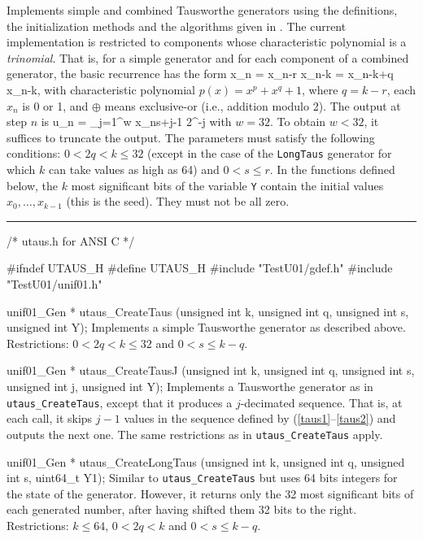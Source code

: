 
Implements simple and combined Tausworthe generators using
the definitions, the initialization methods and the
 algorithms given in \cite{rLEC94a,rLEC96a}.
The current implementation is restricted to components whose
characteristic polynomial is a {\em trinomial}.  That is,
for a  simple generator and for each component of a combined
generator, the basic recurrence has the form %
\eq                                               {}
  x_n = x_{n-r} \oplus x_{n-k} = x_{n-k+q} \oplus x_{n-k},
\endeq
with characteristic polynomial $p(x) = x^p + x^q + 1$,
where $q = k-r$, each $x_n$ is 0 or 1, and $\oplus$
means exclusive-or (i.e., addition modulo 2).
The output at step $n$ is
\eq                                               {}
  u_n = \sum_{j=1}^w x_{ns+j-1} 2^{-j}
\endeq
with $w = 32$.
To obtain $w < 32$, it suffices to truncate the output.
The parameters must satisfy the following conditions:
$0 < 2q < k \le 32$ (except in the case of the {\tt LongTaus} generator
for which $k$ can take values as high as 64) and $0 < s \le r$.
In the functions defined below, the $k$ most significant
bits of the variable {\tt Y} contain
the initial values  $x_0,\dots,x_{k-1}$ (this is the seed).
They must not be all zero.

\bigskip
\hrule
\code
\hide
/* utaus.h for ANSI C */

#ifndef UTAUS_H
#define UTAUS_H
\endhide
#include "TestU01/gdef.h"
#include "TestU01/unif01.h"


unif01_Gen * utaus_CreateTaus (unsigned int k, unsigned int q,
                               unsigned int s, unsigned int Y);
\endcode
  \tab  Implements a simple Tausworthe generator as described above.
   Restrictions: $0 < 2q < k \le 32$ and $0 < s \le k-q$.
  \endtab
\code


unif01_Gen * utaus_CreateTausJ (unsigned int k, unsigned int q,
                                unsigned int s, unsigned int j,
                                unsigned int Y);
\endcode
  \tab  Implements a Tausworthe generator as in {\tt utaus\_CreateTaus},
   except that it produces a $j$-decimated sequence.
   That is, at each call, it skips $j-1$ values in the sequence
   defined by (\ref{taus1}--\ref{taus2}) and outputs the next one.
   The same restrictions as in {\tt utaus\_CreateTaus} apply.
  \endtab
\code


unif01_Gen * utaus_CreateLongTaus (unsigned int k, unsigned int q,
                                   unsigned int s, uint64_t Y1);
\endcode
  \tab    Similar to {\tt utaus\_CreateTaus} but uses
   64 bits integers for the state of the generator. However, it returns
   only the 32 most significant bits of each  generated number, after
   having shifted them 32 bits to the right.
   Restrictions: $k \le 64$, $0 < 2q < k$ and $0 < s \le k-q$.
  \endtab
\code


